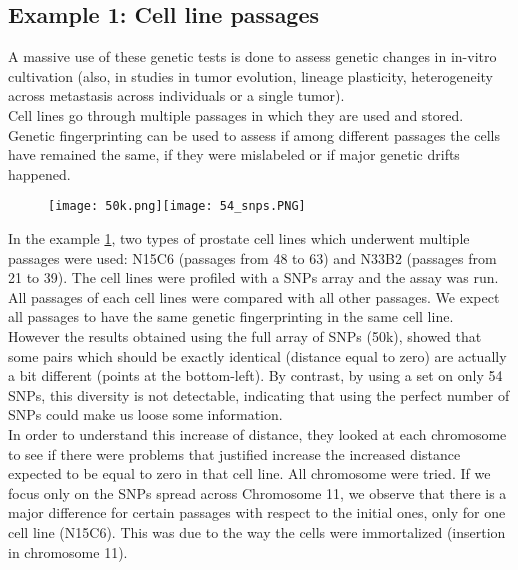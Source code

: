 \subsection{Example 1: Cell line passages}
A massive use of these genetic tests is done to assess genetic changes in in-vitro cultivation (also, in studies in tumor evolution, lineage plasticity, heterogeneity across metastasis across individuals or a single tumor).\\
Cell lines go through multiple passages in which they are used and stored. Genetic fingerprinting can be used to assess if among different passages the cells have remained the same, if they were mislabeled or if major genetic drifts happened.

\begin{figure}[H]
	\centering
	\texttt{[image: 50k.png]}\quad\texttt{[image: 54\_snps.PNG]}
	\caption{}
	\label{fig: cell_lines}
\end{figure}


In the example \ref{fig: cell_lines}, two types of prostate cell lines which underwent multiple passages were used: N15C6 (passages from 48 to 63) and N33B2 (passages from 21 to 39).
The cell lines were profiled with a SNPs array and the assay was run.\\
All passages of each cell lines were compared with all other passages. We expect all passages to have the same genetic fingerprinting in the same cell line.
\\
However the results obtained using the full array of SNPs (50k), showed that some pairs which should be exactly identical (distance equal to zero) are actually a bit different (points at the bottom-left).
By contrast, by using a set on only 54 SNPs, this diversity is not detectable, indicating  that using the perfect number of SNPs could make us loose some information.
\\

In order to understand this increase of distance, they looked at each chromosome to see if there were problems that justified increase the increased distance expected to be equal to zero in that cell line. All chromosome were tried. If we focus only on the SNPs spread across Chromosome 11, we observe that there is a major difference for certain passages with respect to the initial ones, only for one cell line (N15C6). This was due to the way the cells were immortalized (insertion in chromosome 11).

